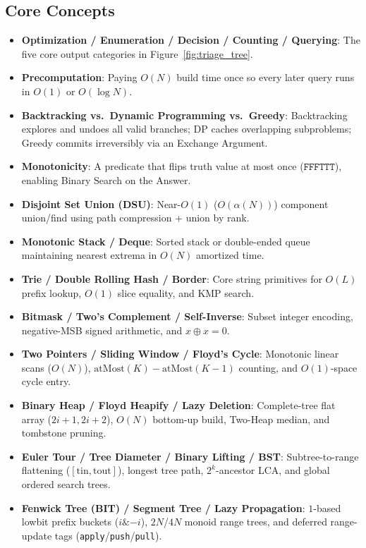 \documentclass[11pt,a4paper]{article}
\begin{document}
\subsection*{Core Concepts}
\begin{itemize}[itemsep=2pt]
    \item \textbf{Optimization / Enumeration / Decision / Counting / Querying}: The five core output categories in Figure~\ref{fig:triage_tree}.
    \item \textbf{Precomputation}: Paying $O(N)$ build time once so every later query runs in $O(1)$ or $O(\log N)$.
    \item \textbf{Backtracking vs.\ Dynamic Programming vs.\ Greedy}: Backtracking explores and undoes all valid branches; DP caches overlapping subproblems; Greedy commits irreversibly via an Exchange Argument.
    \item \textbf{Monotonicity}: A predicate that flips truth value at most once ($\texttt{FFFTTT}$), enabling Binary Search on the Answer.
    \item \textbf{Disjoint Set Union (DSU)}: Near-$O(1)$ ($O(\alpha(N))$) component union/find using path compression + union by rank.
    \item \textbf{Monotonic Stack / Deque}: Sorted stack or double-ended queue maintaining nearest extrema in $O(N)$ amortized time.
    \item \textbf{Trie / Double Rolling Hash / Border}: Core string primitives for $O(L)$ prefix lookup, $O(1)$ slice equality, and KMP search.
    \item \textbf{Bitmask / Two's Complement / Self-Inverse}: Subset integer encoding, negative-MSB signed arithmetic, and $x \oplus x = 0$.
    \item \textbf{Two Pointers / Sliding Window / Floyd's Cycle}: Monotonic linear scans ($O(N)$), $\text{atMost}(K) - \text{atMost}(K{-}1)$ counting, and $O(1)$-space cycle entry.
    \item \textbf{Binary Heap / Floyd Heapify / Lazy Deletion}: Complete-tree flat array ($2i{+}1, 2i{+}2$), $O(N)$ bottom-up build, Two-Heap median, and tombstone pruning.
    \item \textbf{Euler Tour / Tree Diameter / Binary Lifting / BST}: Subtree-to-range flattening ($[\text{tin}, \text{tout}]$), longest tree path, $2^k$-ancestor LCA, and global ordered search trees.
    \item \textbf{Fenwick Tree (BIT) / Segment Tree / Lazy Propagation}: $1$-based lowbit prefix buckets ($i \mathbin{\&} -i$), $2N$/$4N$ monoid range trees, and deferred range-update tags (\texttt{apply}/\texttt{push}/\texttt{pull}).
\end{itemize}
\end{document}
